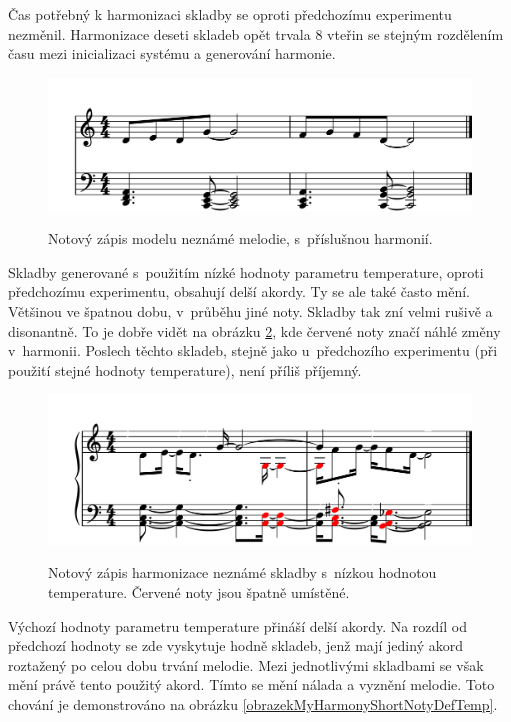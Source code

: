 Čas potřebný k harmonizaci skladby se oproti předchozímu experimentu nezměnil.
Harmonizace deseti skladeb opět trvala 8 vteřin
se stejným rozdělením času mezi inicializaci systému a generování harmonie.

\begin{figure}[h]\centering
    \centering
    \includegraphics[width=0.8\linewidth]{obrazky/MyHarmonyShort-1.png}\\[1pt]  
    \caption{Notový zápis modelu neznámé melodie, s~příslušnou harmonií.}    
    \label{obrazekMyHarmonyShortNoty}
\end{figure}
\par

Skladby generované s~použitím nízké hodnoty parametru temperature, 
oproti předchozímu experimentu, obsahují delší akordy.
Ty se ale také často mění.
Většinou ve špatnou dobu, v~průběhu jiné noty.
Skladby tak zní velmi rušivě a disonantně.
To je dobře vidět na obrázku \ref{obrazekMyHarmonyShortNotyLowTemp},
kde červené noty značí náhlé změny v~harmonii.
Poslech těchto skladeb, stejně jako u~předchozího experimentu 
(při použití stejné hodnoty temperature), není příliš příjemný.

\begin{figure}[h]\centering
    \centering
    \includegraphics[width=0.8\linewidth]{obrazky/MyHarmonyShortLowTmp-1.png}\\[1pt]  
    \caption{Notový zápis harmonizace neznámé skladby s~nízkou hodnotou temperature.
    Červené noty jsou špatně umístěné.}    
    \label{obrazekMyHarmonyShortNotyLowTemp}
\end{figure}
\par

Výchozí hodnoty parametru temperature přináší delší akordy.
Na rozdíl od předchozí hodnoty se zde vyskytuje hodně skladeb,
jenž mají jediný akord roztažený po celou dobu trvání melodie.
Mezi jednotlivými skladbami se však mění právě tento použitý akord.
Tímto se mění nálada a vyznění melodie.
Toto chování je demonstrováno na obrázku \ref{obrazekMyHarmonyShortNotyDefTemp}.

